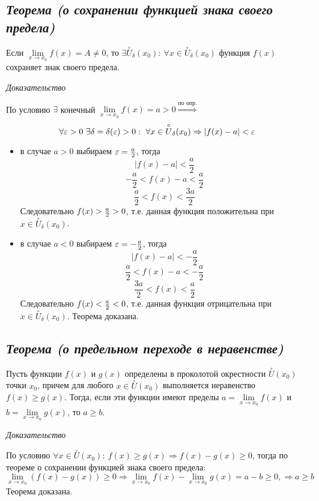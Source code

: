 \subsection{\textit{Теорема (о сохранении функцией знака своего предела)}}

Если $\lim\limits_{x \to x_0} f(x) = A \neq 0$, то $\exists \overset{\circ}U_\delta(x_0): \ \forall x \in \overset{\circ}U_\delta(x_0)$ функция $f(x)$ сохраняет знак своего предела.

\textit{Доказательство}

По условию $\exists$ конечный $\lim\limits_{x \to x_0} f(x) = a > 0 \overset{\text{по опр.}}{\Rightarrow}$ $$\forall {\large\varepsilon} > 0 \ \exists\delta=\delta({\large\varepsilon} )>0: \ \forall x \in \overset{\circ}U_\delta(x_0) \Rightarrow | f(x) - a|  < {\large\varepsilon}$$
\begin{itemize}

\item в случае $a > 0$ выбираем ${\large\varepsilon} = {\Large\frac{a}{2}}$, тогда $$| f(x) - a|  < {\frac{a}{2}}$$ $$-{\frac{a}{2}}< f(x) - a < {\frac{a}{2}}$$ $${\frac{a}{2}}< f(x) < {\frac{3a}{2}}$$ Следовательно $f(x) > {\Large\frac{a}{2}}>0$, т.е. данная функция положительна при $x \in \overset{\circ}U_\delta(x_0)$.
\item в случае $a < 0$ выбираем ${\large\varepsilon} = -{\Large\frac{a}{2}}$, тогда $$| f(x) - a|  < - {\frac{a}{2}}$$ $${\frac{a}{2}}< f(x) - a < -{\frac{a}{2}}$$ $${\frac{3a}{2}}< f(x) < {\frac{a}{2}}$$ Следовательно $f(x) < {\Large\frac{a}{2}}< 0$, т.е. данная функция отрицательна при $x \in \overset{\circ}U_\delta(x_0)$. Теорема доказана.

\end{itemize}
\newpage 
\subsection{\textit{Теорема (о предельном переходе в неравенстве)}}

Пусть функции $f(x)$ и $g(x)$ определены в проколотой окрестности $\overset{\circ}U(x_0)$ точки $x_0$, причем для любого $x \in \overset{\circ}U(x_0)$ выполняется неравенство $f(x) \geqslant g(x)$. Тогда, если эти функции имеют пределы $a = \lim\limits_{x \to x_0}f(x)$ и $b = \lim\limits_{x \to x_0}g(x)$, то $a \geqslant b$.

\textit{Доказательство}

По условию $\forall x \in \overset{\circ}U(x_0): \ f(x) \geqslant g(x) \Rightarrow f(x) - g(x) \geqslant 0$, тогда по теореме о сохранении функцией знака своего предела: $$\lim\limits_{x \to x_0}(f(x) - g(x)) \geqslant 0 \Rightarrow \lim\limits_{x \to x_0}f(x) - \lim\limits_{x \to x_0}g(x) = a - b \geqslant 0, \Rightarrow a \geqslant b$$ Теорема доказана.
\newpage 
